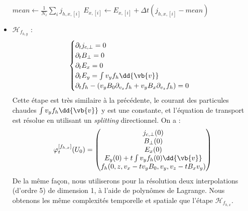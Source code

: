 \begin{itemize}
\begin{algorithm}
\begin{algorithmic}[1]
          \State $mean \gets \frac{1}{N_z}\sum_i j_{h,x,[i]}$
            \State $E_{x,[i]} \gets E_{x,[i]} + \Delta t(j_{h,x,[i]}-mean)$
          \EndFor
        \EndFunction

          \vspace{0.25cm}

          \State {}\label{alg:l:Hfhx:18}
          \State {}\label{alg:l:Hfhx:19}
        \EndFunction
      \end{algorithmic}
    \end{algorithm}

  \item $\mathcal{H}_{f_{h,y}}$ :
    $$
      \begin{cases}
        \partial_t j_{c,\perp} = 0 \\
        \partial_t B_{\perp} = 0 \\
        \partial_t E_{x} = 0 \\
        \partial_t E_{y} = \int v_yf_h\dd{\vb{v}} \\
        \partial_t f_h - (v_yB_0\partial_{v_x}f_h + v_yB_x\partial_{v_z}f_h) = 0
      \end{cases}
    $$
    Cette étape est très similaire à la précédente, le courant des particules chaudes $\int v_yf_h\dd{\vb{v}}$ y est une constante, et l'équation de transport est résolue en utilisant un \emph{splitting} directionnel. On a :
    $$
      \varphi_t^{[f_{h,x}]}(U_0) = \begin{pmatrix}
        j_{c,\perp}(0) \\
        B_{\perp}(0) \\
        E_x(0) \\
        E_y(0) + t\int v_yf_h(0)\dd{\vb{v}} \\
        f_h(0,z,v_x-tv_yB_0,v_y,v_z-tB_xv_y)
      \end{pmatrix}
    $$
    De la même façon, nous utiliserons pour la résolution deux interpolations (d'ordre 5) de dimension 1, à l'aide de polynômes de Lagrange. Nous obtenons les même complexités temporelle et spatiale que l'étape $\mathcal{H}_{f_{h,x}}$.


\end{itemize}
